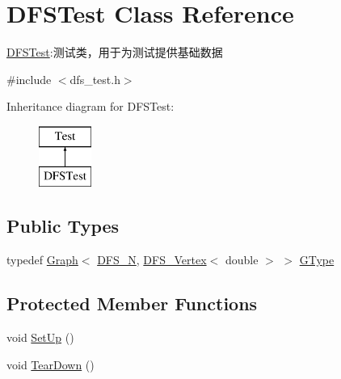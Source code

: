 \hypertarget{class_d_f_s_test}{}\section{D\+F\+S\+Test Class Reference}
\label{class_d_f_s_test}


\hyperlink{class_d_f_s_test}{D\+F\+S\+Test}\+:测试类，用于为测试提供基础数据  




{\ttfamily \#include $<$dfs\+\_\+test.\+h$>$}

Inheritance diagram for D\+F\+S\+Test\+:\begin{figure}[H]
\begin{center}
\leavevmode
\includegraphics[height=2.000000cm]{class_d_f_s_test}
\end{center}
\end{figure}
\subsection*{Public Types}
\begin{DoxyCompactItemize}
\item 
typedef \hyperlink{struct_introduction_to_algorithm_1_1_graph_algorithm_1_1_graph}{Graph}$<$ \hyperlink{dfs__test_8h_a3555131dfa4d016ec8c65706e1835074}{D\+F\+S\+\_\+\+N}, \hyperlink{struct_introduction_to_algorithm_1_1_graph_algorithm_1_1_d_f_s___vertex}{D\+F\+S\+\_\+\+Vertex}$<$ double $>$ $>$ \hyperlink{class_d_f_s_test_a32b63a9c79f6f7e7021daacf076a1512}{G\+Type}
\end{DoxyCompactItemize}
\subsection*{Protected Member Functions}
\begin{DoxyCompactItemize}
\item 
void \hyperlink{class_d_f_s_test_aa8af56e0d079eb7c2b0ba7b6535d7d61}{Set\+Up} ()
\item 
void \hyperlink{class_d_f_s_test_afbe32ab6557cbca62368b480e1df593a}{Tear\+Down} ()
\end{DoxyCompactItemize}
